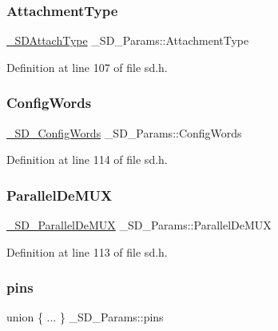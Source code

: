\subsubsection{\texorpdfstring{AttachmentType}{AttachmentType}}
{\footnotesize\ttfamily \mbox{\hyperlink{sd_8h_ab581f52e9a0c0b3237ed39225109fd90}{\+\_\+\+S\+D\+Attach\+Type}} \+\_\+\+S\+D\+\_\+\+Params\+::\+Attachment\+Type}



Definition at line 107 of file sd.\+h.

\mbox{\label{struct__SD__Params_afe8434a321362587a1f7c231b66ed51b}} 
\subsubsection{\texorpdfstring{ConfigWords}{ConfigWords}}
{\footnotesize\ttfamily \mbox{\hyperlink{struct__SD__ConfigWords}{\+\_\+\+S\+D\+\_\+\+Config\+Words}} \+\_\+\+S\+D\+\_\+\+Params\+::\+Config\+Words}



Definition at line 114 of file sd.\+h.

\mbox{\label{struct__SD__Params_aef6ef6adeec34d97a1b90bd39606f3b2}} 
\subsubsection{\texorpdfstring{ParallelDeMUX}{ParallelDeMUX}}
{\footnotesize\ttfamily \mbox{\hyperlink{struct__SD__ParallelDeMUX}{\+\_\+\+S\+D\+\_\+\+Parallel\+De\+M\+UX}} \+\_\+\+S\+D\+\_\+\+Params\+::\+Parallel\+De\+M\+UX}



Definition at line 113 of file sd.\+h.

\mbox{\label{struct__SD__Params_aab37277649a69277194250f502e6fbb3}} 
\subsubsection{\texorpdfstring{pins}{pins}}
{\footnotesize\ttfamily union \{ ... \}   \+\_\+\+S\+D\+\_\+\+Params\+::pins}

